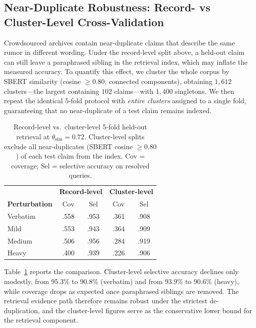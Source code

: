 \documentclass[twoside]{llncs}
\begin{document}
\subsection{Near-Duplicate Robustness: Record- vs Cluster-Level Cross-Validation}
Crowdsourced archives contain near-duplicate claims that describe the same rumor in different wording. Under the record-level split above, a held-out claim can still leave a paraphrased sibling in the retrieval index, which may inflate the measured accuracy. To quantify this effect, we cluster the whole corpus by SBERT similarity (cosine $\ge 0.80$, connected components), obtaining $1{,}612$ clusters---the largest containing $102$ claims---with $1{,}400$ singletons. We then repeat the identical 5-fold protocol with \emph{entire clusters} assigned to a single fold, guaranteeing that no near-duplicate of a test claim remains indexed.

\begin{table}[!htbp]
\caption{Record-level vs.\ cluster-level 5-fold held-out retrieval at $\theta_{\text{sim}} = 0.72$. Cluster-level splits exclude all near-duplicates (SBERT cosine $\ge 0.80$) of each test claim from the index. Cov = coverage; Sel = selective accuracy on resolved queries.}
\label{tab:cluster}
\centering
\begin{tabular}{l|cc|cc}
\toprule
& \multicolumn{2}{c|}{\textbf{Record-level}} & \multicolumn{2}{c}{\textbf{Cluster-level}} \\
\textbf{Perturbation} & Cov & Sel & Cov & Sel \\
\midrule
Verbatim & .558 & .953 & .361 & .908 \\
Mild     & .553 & .943 & .364 & .909 \\
Medium   & .506 & .956 & .284 & .919 \\
Heavy    & .400 & .939 & .226 & .906 \\
\bottomrule
\end{tabular}
\end{table}

Table~\ref{tab:cluster} reports the comparison. Cluster-level selective accuracy declines only modestly, from 95.3\% to 90.8\% (verbatim) and from 93.9\% to 90.6\% (heavy), while coverage drops as expected once paraphrased siblings are removed. The retrieval evidence path therefore remains robust under the strictest de-duplication, and the cluster-level figures serve as the conservative lower bound for the retrieval component.
\end{document}
